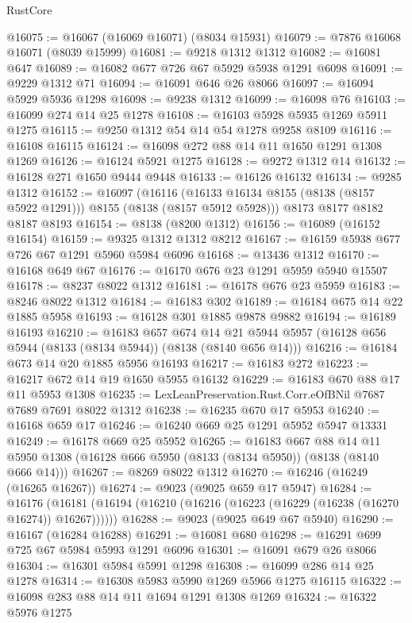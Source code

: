 \begin{lexlean}{RustCore}
\begin{coremodule}
@16075 := @16067 (@16069 @16071) (@8034 @15931)
@16079 := @7876 @16068 @16071 (@8039 @15999)
@16081 := @9218 @1312 @1312
@16082 := @16081 @647
@16089 := @16082 @677 @726 @67 @5929 @5938 @1291 @6098
@16091 := @9229 @1312 @71
@16094 := @16091 @646 @26 @8066
@16097 := @16094 @5929 @5936 @1298
@16098 := @9238 @1312
@16099 := @16098 @76
@16103 := @16099 @274 @14 @25 @1278
@16108 := @16103 @5928 @5935 @1269 @5911 @1275
@16115 := @9250 @1312 @54 @14 @54 @1278 @9258 @8109
@16116 := @16108 @16115
@16124 := @16098 @272 @88 @14 @11 @1650 @1291 @1308 @1269
@16126 := @16124 @5921 @1275
@16128 := @9272 @1312 @14
@16132 := @16128 @271 @1650 @9444 @9448
@16133 := @16126 @16132
@16134 := @9285 @1312
@16152 := @16097
    (@16116 (@16133 @16134 @8155 (@8138 (@8157 @5922 @1291))) @8155 (@8138 (@8157 @5912 @5928)))
    @8173
    @8177
    @8182
    @8187
    @8193
@16154 := @8138 (@8200 @1312)
@16156 := @16089 (@16152 @16154)
@16159 := @9325 @1312 @1312 @8212
@16167 := @16159 @5938 @677 @726 @67 @1291 @5960 @5984 @6096
@16168 := @13436 @1312
@16170 := @16168 @649 @67
@16176 := @16170 @676 @23 @1291 @5959 @5940 @15507
@16178 := @8237 @8022 @1312
@16181 := @16178 @676 @23 @5959
@16183 := @8246 @8022 @1312
@16184 := @16183 @302
@16189 := @16184 @675 @14 @22 @1885 @5958
@16193 := @16128 @301 @1885 @9878 @9882
@16194 := @16189 @16193
@16210 := @16183
    @657
    @674
    @14
    @21
    @5944
    @5957
    (@16128 @656 @5944 (@8133 (@8134 @5944)) (@8138 (@8140 @656 @14)))
@16216 := @16184 @673 @14 @20 @1885 @5956 @16193
@16217 := @16183 @272
@16223 := @16217 @672 @14 @19 @1650 @5955 @16132
@16229 := @16183 @670 @88 @17 @11 @5953 @1308
@16235 := LexLeanPreservation.Rust.Corr.eOfBNil @7687 @7689 @7691 @8022 @1312
@16238 := @16235 @670 @17 @5953
@16240 := @16168 @659 @17
@16246 := @16240 @669 @25 @1291 @5952 @5947 @13331
@16249 := @16178 @669 @25 @5952
@16265 := @16183
    @667
    @88
    @14
    @11
    @5950
    @1308
    (@16128 @666 @5950 (@8133 (@8134 @5950)) (@8138 (@8140 @666 @14)))
@16267 := @8269 @8022 @1312
@16270 := @16246 (@16249 (@16265 @16267))
@16274 := @9023 (@9025 @659 @17 @5947)
@16284 := @16176
    (@16181 (@16194 (@16210 (@16216 (@16223 (@16229 (@16238 (@16270 @16274)) @16267))))))
@16288 := @9023 (@9025 @649 @67 @5940)
@16290 := @16167 (@16284 @16288)
@16291 := @16081 @680
@16298 := @16291 @699 @725 @67 @5984 @5993 @1291 @6096
@16301 := @16091 @679 @26 @8066
@16304 := @16301 @5984 @5991 @1298
@16308 := @16099 @286 @14 @25 @1278
@16314 := @16308 @5983 @5990 @1269 @5966 @1275 @16115
@16322 := @16098 @283 @88 @14 @11 @1694 @1291 @1308 @1269
@16324 := @16322 @5976 @1275

\end{coremodule}
\end{lexlean}
